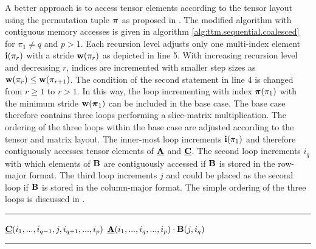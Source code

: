 A better approach is to access tensor elements according to the tensor layout using the permutation tuple $\boldsymbol{\pi}$ as proposed in \cite{bassoy:2018:fast}.
The modified algorithm with contiguous memory accesses is given in algorithm \ref{alg:ttm.sequential.coalesced} for $\pi_1 \neq q$ and $p > 1$.
Each recursion level adjusts only one multi-index element $\mathbf{i}(\pi_r)$ with a stride $\mathbf{w}(\pi_r)$ as depicted in line 5.
With increasing recursion level and decreasing $r$, indices are incremented with smaller step sizes as $\mathbf{w}(\pi_r) \leq \mathbf{w}(\pi_{r+1})$. 
The condition of the second  statement in line 4 is changed from $r \geq 1$ to $r > 1$.
In this way, the loop incrementing with index $\boldsymbol{\pi}(\pi_1)$ with the minimum stride $\mathbf{w}(\boldsymbol{\pi}_1)$ can be included in the base case.
The base case therefore contains three loops performing a slice-matrix multiplication. 
The ordering of the three loops within the base case are adjusted according to the tensor and matrix layout.
The inner-most loop increments $\mathbf{i}(\pi_1)$ and therefore contiguously accesses tensor elements of $\mubA$ and $\mubC$.
The second loop increments $i_q$ with which elements of $\mathbf{B}$ are contiguously accessed if $\mathbf{B}$ is stored in the row-major format.
The third loop increments $j$ and could be placed as the second loop if $\mathbf{B}$ is stored in the column-major format.
The simple ordering of the three loops is discussed in \cite{golub:2013:matrix.computations}.

\begin{algorithm}[t]
\DontPrintSemicolon
{}
%
\footnotesize 
\SetAlgoVlined
\hrule
\BlankLine
{}
{
	{
	}
	{
		{
			\;
		}		
	}	
	\Else%
	{
		{
			{			
				{
					$\underline{\mathbf{C}}(i_1,...,i_{q-1},j,i_{q+1},...,i_{p})$ \ttt{+=} $\underline{\mathbf{A}}(i_1,...,i_q,...,i_p) \cdot \mathbf{B}(j,i_q)$\;
				}
			}
		}
	}
}
\BlankLine
\hrule
\caption{
\footnotesize %
Modified baseline algorithm with contiguous memory access for the tensor-matrix multiplication.
The tensor order must be greater than one and for the contraction mode $1 \leq q \leq p$ and $\pi_1 \neq q$ must hold.
The algorithm needs to be initially called with $r=p$ where $\mbn$ is the shape tuple of $\mubA$ and $m$ is the $q$-th dimension of $\mubC$. 
\label{alg:ttm.sequential.coalesced}
}
\end{algorithm}

